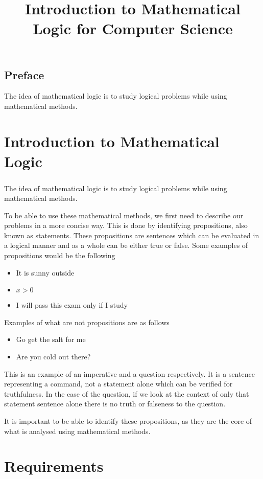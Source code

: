 \documentclass[12pt,oneside,notitlepage]{book}
\title{Introduction to Mathematical Logic for Computer Science}
\theoremstyle{definition}
\begin{document}

\thispagestyle{empty}
\section*{Preface}
The idea of mathematical logic is to study logical problems while using mathematical methods.

\noindent
\tableofcontents
\thispagestyle{empty}
\clearpage
\newpage

\setcounter{page}{1}

\chapter*{Introduction to Mathematical Logic}
\paragraph{}
The idea of mathematical logic is to study logical problems while using mathematical methods.

To be able to use these mathematical methods, we first need to describe our problems in a more concise way. This is done by identifying propositions, also known as statements. These propositions are sentences which can be evaluated in a logical manner and as a whole can be either true or false. Some examples of propositions would be the following
\begin{itemize}
\item It is sunny outside
\item $x > 0$
\item I will pass this exam only if I study
\end{itemize}
Examples of what are not propositions are as follows
\begin{itemize}
\item Go get the salt for me
\item Are you cold out there?
\end{itemize}
This is an example of an imperative and a question respectively. It is a sentence representing a command, not a statement alone which can be verified for truthfulness. In the case of the question, if we look at the context of only that statement sentence alone there is no truth or falseness to the question.

It is important to be able to identify these propositions, as they are the core of what is analysed using mathematical methods.

\chapter{Requirements}
\end{document}
